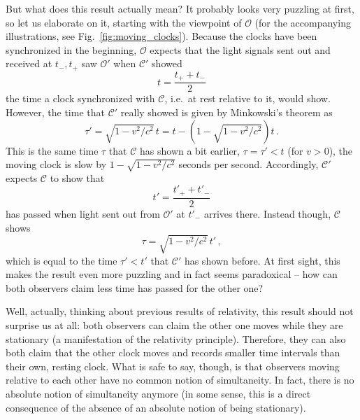 \documentclass[../relativity_main.tex]{subfiles}
\begin{document}




But what does this result actually mean? It probably looks very puzzling at first, so let us elaborate on it, starting with the viewpoint of $\mathcal{O}$ (for the accompanying illustrations, see Fig.~\ref{fig:moving_clocks}). Because the clocks have been synchronized in the beginning, $\mathcal{O}$ expects that the light signals sent out and received at $t_-, t_+$ saw $\mathcal{O}'$ when $\mathcal{C}'$ showed
\begin{equation*}
	t = \frac{t_+ + t_-}{2}
\end{equation*}
the time a clock synchronized with $\mathcal{C}$, i.e.~at rest relative to it, would show. However, the time that $\mathcal{C}'$ really showed is given by Minkowski's theorem as
\begin{equation*}
	\tau' = \sqrt{1 - v^2 / c^2} \, t = t - (1 - \sqrt{1 - v^2 / c^2}) t \, .
\end{equation*}
This is the same time $\tau$ that $\mathcal{C}$ has shown a bit earlier, $\tau = \tau' < t$ (for $v > 0$), the moving clock is slow by $1 - \sqrt{1 - v^2 / c^2}$ seconds per second. Accordingly, $\mathcal{C}'$ expects $\mathcal{C}$ to show that
\begin{equation*}
	t' = \frac{t'_+ + t'_-}{2}
\end{equation*}
has passed when light sent out from $\mathcal{O}'$ at $t'_-$ arrives there. Instead though, $\mathcal{C}$ shows
\begin{equation*}
	\tau = \sqrt{1 - v^2 / c^2} \, t' \, ,
\end{equation*}
which is equal to the time $\tau' < t'$ that $\mathcal{C}'$ has shown before. At first sight, this makes the result even more puzzling and in fact seems paradoxical -- how can both observers claim less time has passed for the other one?


Well, actually, thinking about previous results of relativity, this result should not surprise us at all: both observers can claim the other one moves while they are stationary (a manifestation of the relativity principle). Therefore, they can also both claim that the other clock moves and records smaller time intervals than their own, resting clock. What is safe to say, though, is that observers moving relative to each other have no common notion of simultaneity. In fact, there is no absolute notion of simultaneity anymore (in some sense, this is a direct consequence of the absence of an absolute notion of being stationary). 
\end{document}
